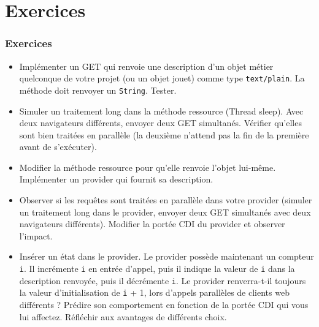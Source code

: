 \documentclass[english, french]{beamer}
\begin{document}
\section{Exercices}
\begin{frame}[allowframebreaks]
	\frametitle{Exercices}
	\begin{itemize}
		\item Implémenter un GET qui renvoie une description d’un objet métier quelconque de votre projet (ou un objet jouet) comme type \texttt{text/plain}. La méthode doit renvoyer un \texttt{String}. Tester.
		\item Simuler un traitement long dans la méthode ressource (Thread sleep). Avec deux navigateurs différents, envoyer deux GET simultanés. Vérifier qu’elles sont bien traitées en parallèle (la deuxième n’attend pas la fin de la première avant de s’exécuter).
		\item Modifier la méthode ressource pour qu’elle renvoie l’objet lui-même. Implémenter un provider qui fournit sa description.
		\item Observer si les requêtes sont traitées en parallèle dans votre provider (simuler un traitement long dans le provider, envoyer deux GET simultanés avec deux navigateurs différents). Modifier la portée CDI du provider et observer l’impact.
		\item Insérer un état dans le provider. Le provider possède maintenant un compteur \texttt{i}. Il incrémente \texttt{i} en entrée d’appel, puis il indique la valeur de \texttt{i} dans la description renvoyée, puis il décrémente \texttt{i}. Le provider renverra-t-il toujours la valeur d’initialisation de \texttt{i} + 1, lors d’appels parallèles de clients web différents ? Prédire son comportement en fonction de la portée CDI qui vous lui affectez. Réfléchir aux avantages de différents choix.
	\end{itemize}
\end{frame}
\end{document}
